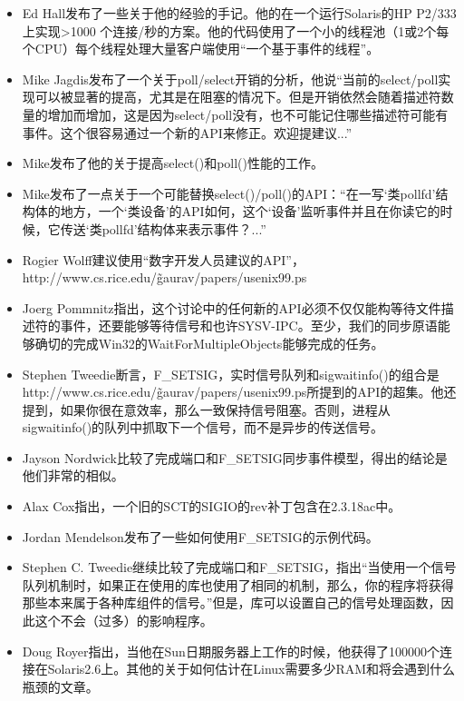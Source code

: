 \documentclass[12pt, twoside, a4paper, xetex]{report}
\begin{document}
	\begin{itemize}
		\item Ed Hall发布了一些关于他的经验的手记。他的在一个运行Solaris的HP P2/333上实现>1000 个连接/秒的方案。他的代码使用了一个小的线程池（1或2个每个CPU）每个线程处理大量客户端使用“一个基于事件的线程”。
		\item Mike Jagdis发布了一个关于poll/select开销的分析，他说“当前的select/poll实现可以被显著的提高，尤其是在阻塞的情况下。但是开销依然会随着描述符数量的增加而增加，这是因为select/poll没有，也不可能记住哪些描述符可能有事件。这个很容易通过一个新的API来修正。欢迎提建议...”
		\item Mike发布了他的关于提高select()和poll()性能的工作。
		\item Mike发布了一点关于一个可能替换select()/poll()的API：“在一写‘类pollfd’结构体的地方，一个‘类设备’的API如何，这个‘设备’监听事件并且在你读它的时候，它传送‘类pollfd’结构体来表示事件？...”
		\item Rogier Wolff建议使用“数字开发人员建议的API”，http://www.cs.rice.edu/\~gaurav/papers/usenix99.ps
		\item Joerg Pommnitz指出，这个讨论中的任何新的API必须不仅仅能构等待文件描述符的事件，还要能够等待信号和也许SYSV-IPC。至少，我们的同步原语能够确切的完成Win32的WaitForMultipleObjects能够完成的任务。
		\item Stephen Tweedie断言，F\_SETSIG，实时信号队列和sigwaitinfo()的组合是http://www.cs.rice.edu/\~gaurav/papers/usenix99.ps所提到的API的超集。他还提到，如果你很在意效率，那么一致保持信号阻塞。否则，进程从sigwaitinfo()的队列中抓取下一个信号，而不是异步的传送信号。
		\item Jayson Nordwick比较了完成端口和F\_SETSIG同步事件模型，得出的结论是他们非常的相似。
		\item Alax Cox指出，一个旧的SCT的SIGIO的rev补丁包含在2.3.18ac中。
		\item Jordan Mendelson发布了一些如何使用F\_SETSIG的示例代码。
		\item Stephen C. Tweedie继续比较了完成端口和F\_SETSIG，指出“当使用一个信号队列机制时，如果正在使用的库也使用了相同的机制，那么，你的程序将获得那些本来属于各种库组件的信号。”但是，库可以设置自己的信号处理函数，因此这个不会（过多）的影响程序。
		\item Doug Royer指出，当他在Sun日期服务器上工作的时候，他获得了100000个连接在Solaris2.6上。其他的关于如何估计在Linux需要多少RAM和将会遇到什么瓶颈的文章。
	\end{itemize}
	
\end{document}
